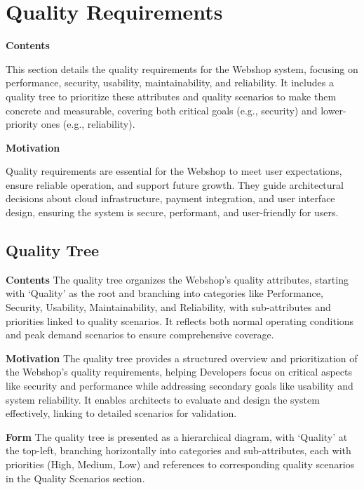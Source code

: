 \hypertarget{section-quality-scenarios}{%
\section{Quality Requirements}\label{section-quality-scenarios}}

\textbf{Contents}

This section details the quality requirements for the Webshop system, focusing on performance, security, usability, maintainability, and reliability. It includes a quality tree to prioritize these attributes and quality scenarios to make them concrete and measurable, covering both critical goals (e.g., security) and lower-priority ones (e.g., reliability).

\textbf{Motivation}

Quality requirements are essential for the Webshop to meet user expectations, ensure reliable operation, and support future growth. They guide architectural decisions about cloud infrastructure, payment integration, and user interface design, ensuring the system is secure, performant, and user-friendly for users.

\hypertarget{_quality_tree}{%
\subsection{Quality Tree}\label{_quality_tree}}

\textbf{Contents}
The quality tree organizes the Webshop’s quality attributes, starting with ‘Quality’ as the root and branching into categories like Performance, Security, Usability, Maintainability, and Reliability, with sub-attributes and priorities linked to quality scenarios. It reflects both normal operating conditions and peak demand scenarios to ensure comprehensive coverage.

\textbf{Motivation}
The quality tree provides a structured overview and prioritization of the Webshop’s quality requirements, helping Developers focus on critical aspects like security and performance while addressing secondary goals like usability and system reliability. It enables architects to evaluate and design the system effectively, linking to detailed scenarios for validation.

\textbf{Form}
The quality tree is presented as a hierarchical diagram, with ‘Quality’ at the top-left, branching horizontally into categories and sub-attributes, each with priorities (High, Medium, Low) and references to corresponding quality scenarios in the Quality Scenarios section.

